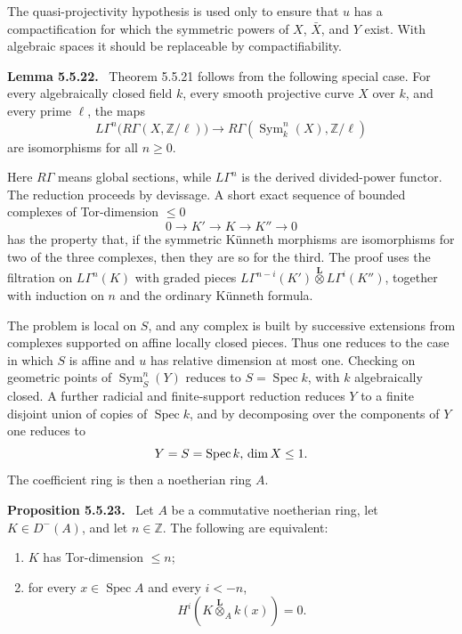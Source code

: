 \documentclass[12pt]{article}
\newcommand{\Zz}{\mathbb Z}
\DeclareMathOperator{\Spec}{Spec}
\DeclareMathOperator{\Sym}{Sym}
\newcommand{\otimesL}{\mathbin{\overset{\mathbf L}{\otimes}}}
\newenvironment{statement}[1]{\par\medskip\noindent\textbf{#1.}\ }{\par\medskip}
\begin{document}
The quasi-projectivity hypothesis is used only to ensure that \(u\) has a compactification for which the symmetric powers of \(X\), \(\bar X\), and \(Y\) exist. With algebraic spaces it should be replaceable by compactifiability.

\begin{statement}{Lemma 5.5.22}
Theorem 5.5.21 follows from the following special case. For every algebraically closed field \(k\), every smooth projective curve \(X\) over \(k\), and every prime \(\ell\), the maps
\[
L\Gamma^n\bigl(R\Gamma(X,\Zz/\ell)\bigr)
\longrightarrow
R\Gamma(\Sym^n_k(X),\Zz/\ell)
\]
are isomorphisms for all \(n\ge0\).
\end{statement}

Here \(R\Gamma\) means global sections, while \(L\Gamma^n\) is the derived divided-power functor. The reduction proceeds by devissage. A short exact sequence of bounded complexes of Tor-dimension \(\le0\)
\[
0\to K'\to K\to K''\to0
\]
has the property that, if the symmetric K\"unneth morphisms are isomorphisms for two of the three complexes, then they are so for the third. The proof uses the filtration on \(L\Gamma^n(K)\) with graded pieces \(L\Gamma^{n-i}(K')\otimesL L\Gamma^i(K'')\), together with induction on \(n\) and the ordinary K\"unneth formula.

The problem is local on \(S\), and any complex is built by successive extensions from complexes supported on affine locally closed pieces. Thus one reduces to the case in which \(S\) is affine and \(u\) has relative dimension at most one. Checking on geometric points of \(\Sym^n_S(Y)\) reduces to \(S=\Spec k\), with \(k\) algebraically closed. A further radicial and finite-support reduction reduces \(Y\) to a finite disjoint union of copies of \(\Spec k\), and by decomposing over the components of \(Y\) one reduces to
\[
Y=S=\Spec k,\\ \dim X\le1.
\]
The coefficient ring is then a noetherian ring \(A\).

\begin{statement}{Proposition 5.5.23}
Let \(A\) be a commutative noetherian ring, let \(K\in D^-(A)\), and let \(n\in\Zz\). The following are equivalent:
\begin{enumerate}[label=(\roman*)]
\item \(K\) has Tor-dimension \(\le n\);
\item for every \(x\in\Spec A\) and every \(i<-n\),
\[
H^i(K\otimesL_A k(x))=0.
\]
\end{enumerate}
\end{statement}
\end{document}
